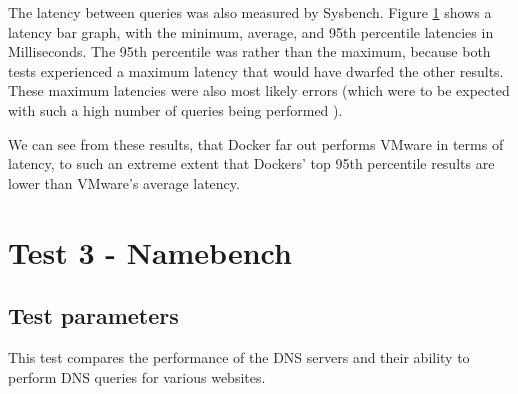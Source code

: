 The latency between queries was also measured by Sysbench. Figure \ref{test2latencygraph} shows a latency bar graph, with the minimum, average, and 95th percentile latencies in Milliseconds. The 95th percentile was rather than the maximum, because both tests experienced a maximum latency that would have dwarfed the other results. These maximum latencies were also most likely errors (which were to be expected with such a high number of queries being performed \citep{oltp}).

\begin{figure}[H]
\caption{}
\label{test2latencygraph}
\centering
\end{figure}

We can see from these results, that Docker far out performs VMware in terms of latency, to such an extreme extent that Dockers' top 95th percentile results are lower than VMware's average latency.

\section{Test 3 - Namebench}
\subsection{Test parameters}
This test compares the performance of the DNS servers and their ability to perform DNS queries for various websites.

